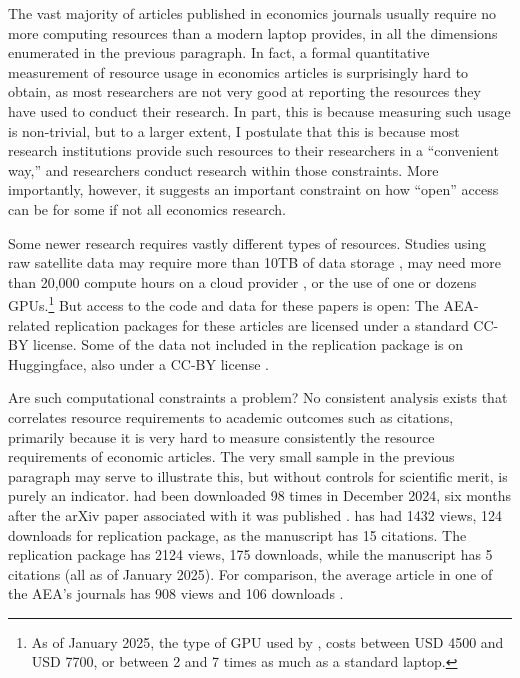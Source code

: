 \documentclass{article}
\begin{document}
The vast majority of articles published in economics journals usually require no more computing resources than a modern laptop provides, in all the dimensions enumerated in the previous paragraph. In fact, a formal quantitative measurement of resource usage in economics articles is surprisingly hard to obtain, as most researchers are not very good at reporting the resources they have used to conduct their research. In part, this is because measuring such usage is non-trivial, but to a larger extent, I postulate that this is because most research institutions provide such resources to their researchers in a ``convenient way,'' and researchers conduct research within those constraints. More importantly, however, it suggests an important constraint on how ``open'' access can be for some if not all economics research.

Some newer research requires vastly different types of resources. Studies using raw satellite data may require more than 10TB of data storage \citep{khachiyan_using_2022,khachiyan_data_2022}, may need more than 20,000 compute hours on a cloud provider \citep{rudik_optimal_2020,rudik_data_2020}, or the use of one \citep{dell_deep_2024,dell_data_2025} or dozens \citep{khachiyan_data_2022} \acp{GPU}.\footnote{As of January 2025, the type of \ac{GPU} used by \citet{dell_data_2025}, costs between USD 4500 and USD 7700, or between 2 and 7 times as much as a standard laptop.} But  access to the code and data for these papers is open: The AEA-related replication packages for these articles are licensed under a standard \ac{CC-BY} license. Some of the data not included in the \citet{dell_data_2025} replication package is on Huggingface, also under a \ac{CC-BY} license \citep{silcock_newswire_2024}.

Are such computational constraints a problem? No consistent analysis exists that correlates resource requirements to academic outcomes such as citations, primarily because it is very hard to measure consistently the resource requirements of economic articles. The very small sample in the previous paragraph may serve to illustrate this, but without controls for scientific merit, is purely an indicator. \citet{silcock_newswire_2024} had been downloaded 98 times in December 2024, six months after the arXiv paper associated with it was published \citep{silcock_newswire_2024}. \citet{rudik_data_2020} has had  1432 views, 124 downloads for replication package, as the manuscript \citep{rudik_optimal_2020} has 15 citations. The replication package \citet{khachiyan_data_2022} has  2124 views, 175 downloads, while the manuscript \citep{khachiyan_using_2022} has 5 citations (all as of January 2025). For comparison, the average article in one of the \ac{AEA}'s journals has 908 views and 106 downloads \citep[Table 4]{vilhuber_report_2025}.
\end{document}
